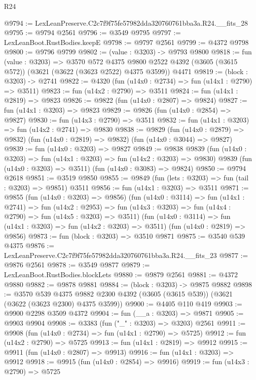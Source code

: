 \begin{lexlean}{R24}
\begin{coremodule}
@9794 := LexLeanPreserve.C2c7f9f75fe57982dda320760761bba3a.R24.__fits_28
@9795 := @9794 @2561
@9796 := @3549 @9795
@9797 := LexLeanBoot.RustBodies.keepE
@9798 := @9797 @2561
@9799 := @4372 @9798
@9800 := @9796 @9799
@9802 := (value : @3203) -> @9793 @9800
@9818 := fun (value : @3203) =>
  @3570
    @572
    @4375
    @9800
    @2522
    @4392
    (@3605 (@3615 @572))
    (@3621 (@3622 (@3623 @2522) @4375 @3599))
    @4471
@9819 := (block : @3203) -> @2741
@9822 := @4320 (fun (u14x0 : @2734) => fun (u14x1 : @2790) => @3511)
@9823 := fun (u14x2 : @2790) => @3511
@9824 := fun (u14x1 : @2819) => @9823
@9826 := @9822 (fun (u14x0 : @2807) => @9824)
@9827 := fun (u14x1 : @3203) => @9823
@9829 := @9826 (fun (u14x0 : @2854) => @9827)
@9830 := fun (u14x3 : @2790) => @3511
@9832 := fun (u14x1 : @3203) => fun (u14x2 : @2741) => @9830
@9838 := @9829
    (fun (u14x0 : @2879) => @9832)
    (fun (u14x0 : @2819) => @9832)
    (fun (u14x0 : @3044) => @9827)
@9839 := fun (u14x0 : @3203) => @9827
@9849 := @9838
    @9839
    (fun (u14x0 : @3203) => fun (u14x1 : @3203) => fun (u14x2 : @3203) => @9830)
    @9839
    (fun (u14x0 : @3203) => @3511)
    (fun (u14x0 : @3083) => @9824)
@9850 := @9794 @2618
@9851 := @3519 @9850
@9855 := @9849 (fun (lets : @3203) => fun (tail : @3203) => @9851) @3511
@9856 := fun (u14x1 : @3203) => @3511
@9871 := @9855
    (fun (u14x0 : @3203) => @9856)
    (fun (u14x0 : @3114) =>
    fun (u14x1 : @2741) =>
    fun (u14x2 : @2953) =>
    fun (u14x3 : @3203) => fun (u14x4 : @2790) => fun (u14x5 : @3203) => @3511)
    (fun (u14x0 : @3114) => fun (u14x1 : @3203) => fun (u14x2 : @3203) => @3511)
    (fun (u14x0 : @2819) => @9856)
@9873 := fun (block : @3203) => @3510 @9871
@9875 := @3540 @539 @4375
@9876 := LexLeanPreserve.C2c7f9f75fe57982dda320760761bba3a.R24.__fits_23
@9877 := @9876 @2561
@9878 := @3549 @9877
@9879 := LexLeanBoot.RustBodies.blockLets
@9880 := @9879 @2561
@9881 := @4372 @9880
@9882 := @9878 @9881
@9884 := (block : @3203) -> @9875 @9882
@9898 := @3570
    @539
    @4375
    @9882
    @2300
    @4392
    (@3605 (@3615 @539))
    (@3621 (@3622 (@3623 @2300) @4375 @3599))
@9900 := @4405 @110 @419
@9903 := @9900 @2298 @3509 @4372
@9904 := fun (__a : @3203) => @9871
@9905 := @9903 @9904
@9908 := @3383 (fun ("_" : @3203) => @3203) @2561
@9911 := @9908 (fun (u14x0 : @2734) => fun (u14x1 : @2790) => @5725)
@9912 := fun (u14x2 : @2790) => @5725
@9913 := fun (u14x1 : @2819) => @9912
@9915 := @9911 (fun (u14x0 : @2807) => @9913)
@9916 := fun (u14x1 : @3203) => @9912
@9918 := @9915 (fun (u14x0 : @2854) => @9916)
@9919 := fun (u14x3 : @2790) => @5725

\end{coremodule}
\end{lexlean}
